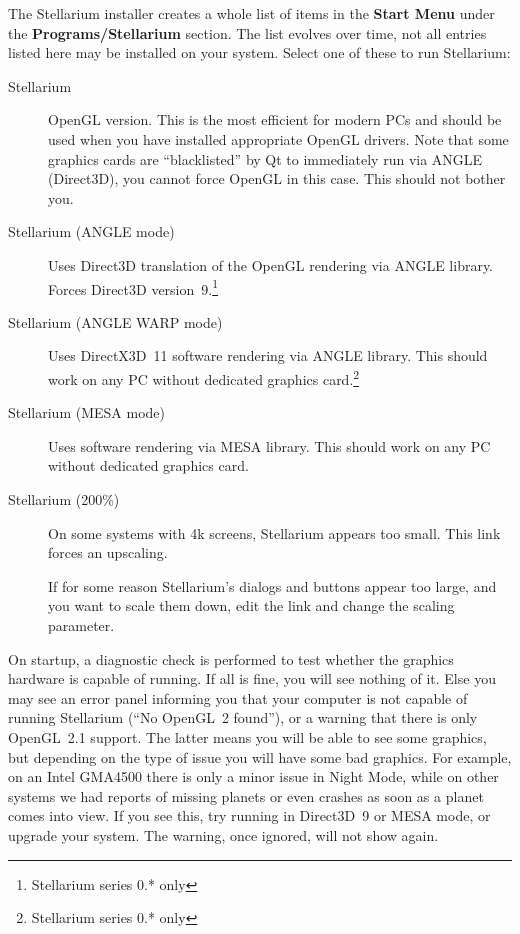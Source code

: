 The Stellarium installer creates a whole list of items in the
\textbf{Start Menu} under the \textbf{Programs/Stellarium}
section. The list evolves over time, not all entries listed here 
may be installed on your system. Select one of these to run Stellarium:
\begin{description}
\item[Stellarium] OpenGL version. This is the most efficient for
  modern PCs and should be used when you have installed appropriate
  OpenGL drivers. Note that some graphics cards are ``blacklisted'' by
  Qt to immediately run via ANGLE (Direct3D), you cannot force OpenGL in this
  case. This should not bother you.
\item[Stellarium (ANGLE mode)] Uses Direct3D translation of the OpenGL
  rendering via ANGLE library.  Forces Direct3D version~9.\footnote{Stellarium series 0.* only}
\item[Stellarium (ANGLE WARP mode)] Uses DirectX3D~11 software
    rendering via ANGLE library. This should work on any PC without
    dedicated graphics card.\footnote{Stellarium series 0.* only}
\item[Stellarium (MESA mode)] Uses software rendering via MESA
  library. This should work on any PC without dedicated graphics card.
\item[Stellarium (200\%)] On some systems with 4k screens, Stellarium appears too small. 
This link forces an upscaling. 

If for some reason Stellarium's dialogs and buttons appear too large, and you want to scale them down, 
edit the link and change the scaling parameter. 
\end{description}
On startup, a diagnostic check is performed to test whether the
graphics hardware is capable of running. If all is fine, you will see
nothing of it.  Else you may see an error panel informing you that
your computer is not capable of running Stellarium (``No OpenGL~2
found''), or a warning that there is only OpenGL~2.1 support. The
latter means you will be able to see some graphics, but depending on
the type of issue you will have some bad graphics. For example, on an
Intel GMA4500 there is only a minor issue in Night Mode, while on
other systems we had reports of missing planets or even crashes as
soon as a planet comes into view. If you see this, try running in
Direct3D~9 or MESA mode, or upgrade your system. The warning, once
ignored, will not show again.

